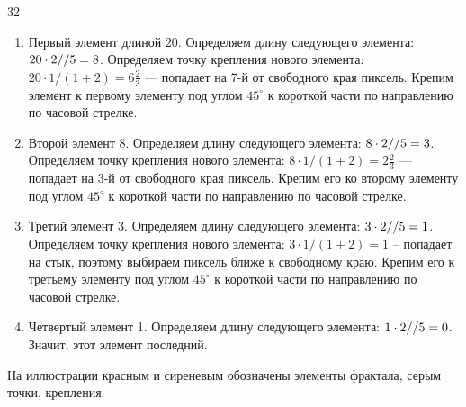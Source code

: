 \begin{myverbbox}[\small]{\voutput}
    32
\end{myverbbox}

\explanationSection
\begin{enumerate}
    \item Первый элемент длиной $20$. Определяем длину следующего элемента: $20 \cdot 2\space // \space 5 = 8$. Определяем точку 
    крепления нового элемента: $20 \cdot 1 / (1 + 2) = 6 \frac{2}{3}$  — попадает на 7-й от свободного края пиксель. Крепим элемент 
    к первому элементу под углом $45^{\circ}$ к короткой части по направлению по часовой стрелке. 
    \item Второй элемент $8$. Определяем длину следующего элемента: $8 \cdot 2 \space // \space 5 = 3$. Определяем точку крепления 
    нового элемента: $8 \cdot 1 / (1 + 2) = 2 \frac{2}{3}$  — попадает на 3-й от свободного края пиксель. Крепим его ко второму 
    элементу под углом $45^{\circ}$ к короткой части по направлению по часовой стрелке. 
    \item Третий элемент 3. Определяем длину следующего элемента: $3 \cdot 2 \space // \space 5 = 1$. Определяем точку крепления 
    нового элемента: $3 \cdot 1 / (1 + 2) = 1$  -- попадает на стык, поэтому выбираем пиксель ближе к свободному краю. 
    Крепим его к третьему элементу под углом $45^{\circ}$ к короткой части по направлению по часовой стрелке.
    \item Четвертый элемент 1. Определяем длину следующего элемента: $1 \cdot 2 \space // \space 5 = 0$. Значит, этот элемент последний.
\end{enumerate}

На иллюстрации красным и сиреневым обозначены элементы фрактала, серым точки, крепления.


